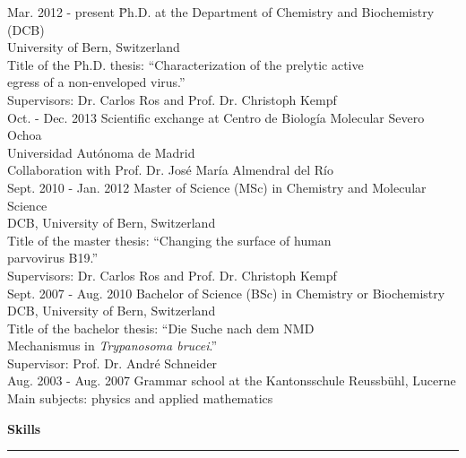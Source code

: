 \normalsize
\begin{tabbing}
Mar. 2012 - present \hspace*{0.9cm} \= Ph.D. at the Department of Chemistry and Biochemistry (DCB) \\ 
\> University of Bern, Switzerland  \\
\> Title of the Ph.D. thesis: ``Characterization of the prelytic
active \\ 
\> egress of a non-enveloped virus.'' \\
\> Supervisors: Dr. Carlos Ros and Prof. Dr. Christoph Kempf \\ [0.3cm]
Oct. - Dec. 2013 \> Scientific exchange at Centro de Biología Molecular Severo Ochoa \\
\> Universidad Autónoma de Madrid \\
\> Collaboration with Prof. Dr. José María Almendral del Río \\ [0.3cm]
Sept. 2010 - Jan. 2012 \> Master of Science (MSc) in Chemistry and Molecular Science \\
\> DCB, University of Bern, Switzerland  \\
\> Title of the master thesis: ``Changing the surface of human \\ \> parvovirus B19.'' \\
\> Supervisors: Dr. Carlos Ros and Prof. Dr. Christoph Kempf \\ [0.3cm]
Sept. 2007 - Aug. 2010 \> Bachelor of Science (BSc) in Chemistry or Biochemistry \\
\> DCB, University of Bern, Switzerland  \\
\> Title of the bachelor thesis: ``Die Suche nach dem NMD \\
\> Mechanismus in \textit{Trypanosoma brucei}.'' \\
\> Supervisor: Prof. Dr. André Schneider \\ [0.3cm]
Aug. 2003 - Aug. 2007 \> Grammar school at the Kantonsschule Reussbühl, Lucerne \\
\> Main subjects: physics and applied mathematics

\end{tabbing}


\Large
\textbf{Skills}
\noindent\rule[0mm]{\linewidth}{2pt}

